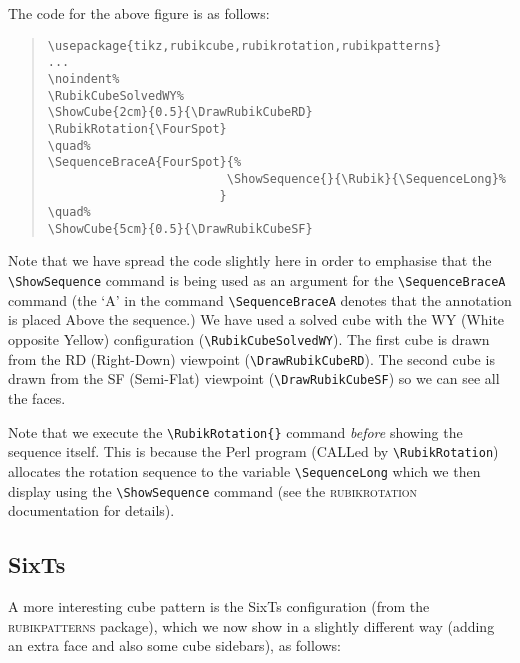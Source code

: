 \documentclass[a4paper]{article}
\begin{document}
\bigskip

\noindent%
\RubikCubeSolvedWY%
\RubikRotation{\FourSpot}
\quad%
\quad%

\bigskip

{\noindent}The code for the above figure is as follows:


\begin{quote}
\begin{verbatim}
\usepackage{tikz,rubikcube,rubikrotation,rubikpatterns}
...
\noindent%
\RubikCubeSolvedWY%
\ShowCube{2cm}{0.5}{\DrawRubikCubeRD}
\RubikRotation{\FourSpot}
\quad%
\SequenceBraceA{FourSpot}{%
                         \ShowSequence{}{\Rubik}{\SequenceLong}%
                        }
\quad%
\ShowCube{5cm}{0.5}{\DrawRubikCubeSF}
\end{verbatim} 
\end{quote}
Note that we have spread  the code slightly here in order to emphasise that 
the \verb!\ShowSequence! command is being used as an argument for the 
\verb!\SequenceBraceA! command (the `A' in the command \verb!\SequenceBraceA! 
denotes that the annotation is placed Above the sequence.)
We have used a solved cube with the WY (White opposite Yellow) 
configuration (\verb!\RubikCubeSolvedWY!).
The first cube is drawn from the  RD (Right-Down) viewpoint (\verb!\DrawRubikCubeRD!).
The second cube is drawn from the SF (Semi-Flat)  viewpoint (\verb!\DrawRubikCubeSF!) 
so we can see all the faces.

Note that we execute the \verb!\RubikRotation{}! command \textit{before} showing 
the sequence itself. This is because the Perl program (CALLed by 
\verb!\RubikRotation!) allocates the rotation sequence to the variable 
\verb!\SequenceLong! which we then display using the \verb!\ShowSequence! command 
(see the \textsc{rubikrotation} documentation for details).


\pagebreak 

\subsection{SixTs}

A  more interesting cube pattern  is the SixTs configuration (from the 
\textsc{rubikpatterns} package),  which we  now show in a slightly 
different way (adding an extra face and also some cube sidebars), as follows:
\end{document}
